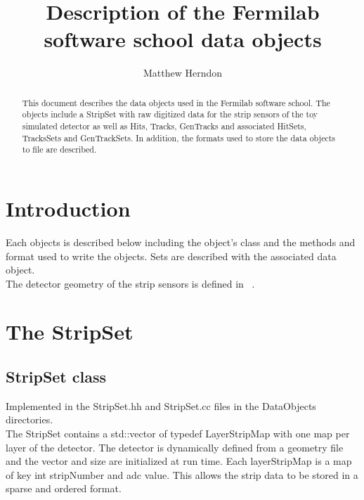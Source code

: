 \documentclass[aps,prd,superscriptaddress,floatfix]{revtex4}
\begin{document}


\title{  
\vspace{0.5cm}
Description of the Fermilab software school data objects
}

\author {Matthew Herndon}

\address{University of Wisconsin, Madison, Wisconsin, Fermi
  National Accelerator Laboratory, Illinois}


\begin{abstract}
\vskip 0.5cm
\noindent
This document describes the data objects used in the Fermilab software school.
The objects include a StripSet with raw digitized data for the strip sensors
of the toy simulated detector as well as Hits, Tracks, GenTracks and associated
HitSets, TracksSets and GenTrackSets.  In addition, the formats used to store the
data objects to file are described.
\end{abstract}
\maketitle


\vspace{0.3cm}

\section{Introduction}
Each objects is described below including the object's class and the methods and
format used to write the objects.  Sets are described with the associated data
object.
\\

The detector geometry of the strip sensors is defined in ~\cite{detectorGeometry}.


\section{The StripSet}
\subsection{StripSet class}
Implemented in the StripSet.hh and StripSet.cc files in the DataObjects directories.
\\

The StripSet contains a std::vector of typedef LayerStripMap with one map per layer of the detector.
The detector is dynamically defined from a geometry file and the vector and size are initialized
at run time.  Each layerStripMap is a map of key int stripNumber and adc value.  This allows
the strip data to be stored in a sparse and ordered format.
\\
\end{document}
